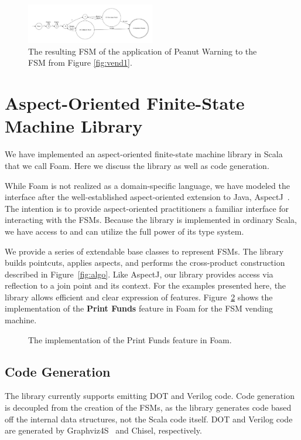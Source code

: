 \documentclass[conference]{IEEEtran}
\begin{document}
\begin{figure}
    \centering
    \includegraphics[width=0.5\textwidth]{figures/vend3.pdf}
    \caption{The resulting FSM of the application of Peanut Warning to the FSM from Figure \ref{fig:vend1}.}
    \label{fig:applyadvice2}
\end{figure}


\section{Aspect-Oriented Finite-State Machine Library}\label{sec:foam}
We have implemented an aspect-oriented finite-state machine library in Scala that we call Foam. Here we discuss the library as well as code generation.

While Foam is not realized as a domain-specific language, we have modeled the interface after the well-established aspect-oriented extension to Java, AspectJ~\cite{aspectj}. The intention is to provide aspect-oriented practitioners a familiar interface for interacting with the FSMs. Because the library is implemented in ordinary Scala, we have access to and can utilize the full power of its type system. 

We provide a series of extendable base classes to represent FSMs. The library builds pointcuts, applies aspects, and performs the cross-product construction described in Figure~\ref{fig:algo}. Like AspectJ, our library provides access via reflection to a join point and its context.  For the examples presented here, the library allows efficient and clear expression of features.  Figure~\ref{lst:PrintFunds} shows the implementation of the \textbf{Print Funds} feature in Foam for the FSM vending machine.

\begin{figure}
    \centering
    
    \caption{The implementation of the Print Funds feature in Foam.}
    \label{lst:PrintFunds}
\end{figure}

\subsection{Code Generation}
The library currently supports emitting DOT and Verilog code. Code generation is decoupled from the creation of the FSMs, as the library generates code based off the internal data structures, not the Scala code itself. DOT and Verilog code are generated by Graphviz4S~\cite{Ldpe2G:19} and Chisel, respectively. 
\end{document}
